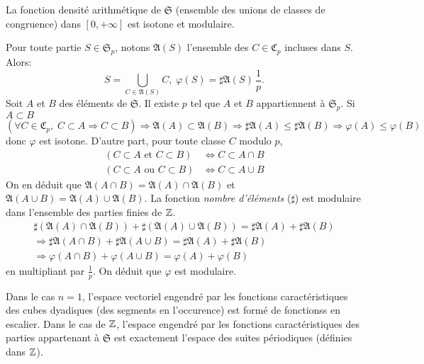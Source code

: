 \begin{propn}
 La fonction densité arithmétique de $\mathfrak{S}$ (ensemble des unions de classes de congruence) dans $[0, +\infty]$ est isotone et modulaire.
\end{propn}
\begin{demo}
  Pour toute partie $S\in \mathfrak{S}_p$, notons $\mathfrak{A}(S)$ l'ensemble des $C \in \mathfrak{C}_p$ incluses dans $S$. Alors:
  \begin{displaymath}
   S = \bigcup_{C\in \mathfrak{A}(S)}C, \; \varphi(S) = \sharp \mathfrak{A}(S)\,\frac{1}{p}.
  \end{displaymath}
  Soit $A$ et $B$ des éléments de $\mathfrak{S}$. Il existe $p$ tel que $A$ et $B$ appartiennent à $\mathfrak{S}_p$.\newline
  Si $A \subset B$
  \begin{displaymath}
   \left(\forall C \in \mathfrak{C}_p, \; C\subset A \Rightarrow C \subset B \right)
   \Rightarrow \mathfrak{A}(A) \subset \mathfrak{A}(B)
   \Rightarrow \sharp \mathfrak{A}(A) \leq \sharp \mathfrak{A}(B)
   \Rightarrow \varphi(A) \leq \varphi(B)
  \end{displaymath}
donc $\varphi$ est isotone. D'autre part, pour toute classe $C$ modulo $p$,
  \begin{align*}
   \left( C\subset A \text{ et } C \subset B \right) &\Leftrightarrow C \subset A \cap B \\
   \left( C\subset A \text{ ou } C \subset B \right) &\Leftrightarrow C \subset A \cup B
  \end{align*}
  On en déduit que $\mathfrak{A}(A \cap B)= \mathfrak{A}(A) \cap \mathfrak{A}(B)$ et $\mathfrak{A}(A \cup B)= \mathfrak{A}(A) \cup \mathfrak{A}(B)$. La fonction \emph{nombre d'éléments} ($\sharp$) est modulaire dans l'ensemble des parties finies de $\mathbb{Z}$.
  \begin{multline*}
   \sharp\left(\mathfrak{A}(A) \cap \mathfrak{A}(B)\right) + \sharp\left(\mathfrak{A}(A) \cup \mathfrak{A}(B)\right)
   = \sharp \mathfrak{A}(A) + \sharp \mathfrak{A}(B) \\
   \Rightarrow \sharp\mathfrak{A}(A \cap B) + \sharp\mathfrak{A}(A \cup B) = \sharp \mathfrak{A}(A) + \sharp \mathfrak{A}(B) \\
   \Rightarrow \varphi(A\cap B) + \varphi(A\cup B) = \varphi(A) + \varphi(B)
  \end{multline*}
en multipliant par $\frac{1}{p}$. On déduit que $\varphi$ est modulaire.
\end{demo}
\begin{rem}
  Dans le cas $n=1$, l'espace vectoriel engendré par les fonctions caractéristiques des cubes dyadiques (des segments en l'occurence) est formé de fonctionss en escalier.\newline
  Dans le cas de $\mathbb{Z}$, l'espace engendré par les fonctions caractéristiques des parties appartenant à $\mathfrak{S}$ est exactement l'espace des suites périodiques (définies dans $\mathbb{Z}$).
\end{rem}

